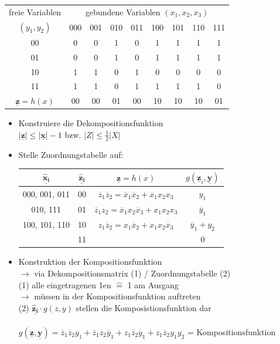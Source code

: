 \documentclass[6pt,a4paper]{scrartcl}
\renewcommand{\vec}[1]{\ensuremath{\underline{\boldsymbol {#1}}}}
\newcommand{\abs}[1]{\ensuremath{\left\vert#1\right\vert}} 							%
\newcommand{\ra}[0]{\ensuremath{\rightarrow}} 									%
\renewcommand{\vec}[1]{\ensuremath{\underline{\boldsymbol {#1}}}}
\begin{document}
\begin{multicols}{3}
		\begin{tabular}{c | c | c | c | c | c | c | c | c }
			freie Variablen & \multicolumn{8}{c}{gebundene Variablen $(x_1, x_2, x_3)$}  \\
			 $(y_1, y_2)$ & 000 &  001 & 010 & 011 & 100 & 101 & 110 & 111  \\ \midrule
			00	& 0 & 0 & 1 & 0 & 1 & 1 & 1 & 1 \\
			01 & 0 & 0 & 1 & 0 & 1 & 1 & 1 & 1 \\
			10 & 1 & 1 & 0 & 1 & 0 & 0 & 0 & 0 \\
			11 & 1 & 1 & 0 & 1 & 1 & 1 & 1 & 0 \\ \midrule
			$\vec z = h(x)$ & 00 & 00 & 01 & 00 & 10 & 10 & 10 & 01
		\end{tabular}
\begin{itemize}
	\item Konstruiere die Dekompositionsfunktion \\
	$ \abs{\vec z} \le \abs{\vec x}  -1 $ bzw. $\abs{Z} \le \frac{1}{2} \abs{X}$
	\item Stelle Zuordnungstabelle auf:\\
		\begin{tabular}{ c | c | c | c }
		$\vec{\hat x_i}$ & $\vec{\hat z_i}$ & $\vec z = h(x)$ & $ g(\vec z_i, \vec y) $ \\ \midrule
		000, 001, 011 & 00 & $\overline z_1 \overline z_2 = \overline x_1 \overline x_2 + \overline x_1 x_2 x_3$ & $y_1 $\\
		010, 111 & 01 &$ \overline z_1 z_2 = \overline x_1 x_2 \overline x_3 + x_1 x_2 x_3$  & $\overline y_1$ \\
		100, 101, 110 & 10 & $z_1 \overline z_2 = x_1 \overline x_2 + x_1 x_2 \overline x_3$ & $\overline y_1 + y_2$ \\
		& 11 & & 0
		\end{tabular}
		
	\item Konstruktion der Kompositionsfunktion \\
	$\ra $ via Dekompositionsmatrix (1) / Zuordnungstabelle (2) \\
		(1) alle eingetragenen 1en $\hat =$ 1 am Ausgang \\
			$\ra$ müssen in der Kompositionsfunktion auftreten \\
		(2) $\vec{\hat z_i} \cdot g(z,y)$ stellen die Komposistionsfunktion dar \\
		\\
	$g(\vec z, \vec y) = \overline z_1 \overline z_2 y_1 + \overline z_1 z_2 \overline y_1 + z_1 \overline z_2 \overline y_1 + z_1 \overline z_2 y_1 y_2 $ = Kompositionsfunktion
	

\end{itemize}
\end{multicols}
\end{document}

